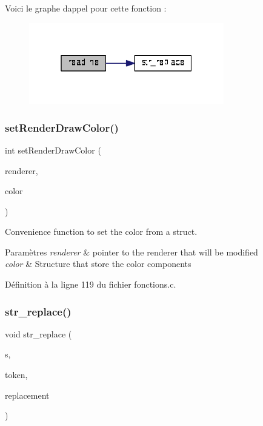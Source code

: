 Voici le graphe d\textquotesingle{}appel pour cette fonction \+:
\nopagebreak
\begin{figure}[H]
\begin{center}
\leavevmode
\includegraphics[width=241pt]{fonctions_8h_afe286242e48f523265fd5fcdae3f7358_cgraph}
\end{center}
\end{figure}
\mbox{\label{fonctions_8h_ad8ec5206bc6a89f1b70d8895523b7919}} 
\subsubsection{set\+Render\+Draw\+Color()}
{\footnotesize\ttfamily int set\+Render\+Draw\+Color (\begin{DoxyParamCaption}\item[{S\+D\+L\+\_\+\+Renderer $\ast$}]{renderer,  }\item[{S\+D\+L\+\_\+\+Color $\ast$}]{color }\end{DoxyParamCaption})}



Convenience function to set the color from a struct. 


\begin{DoxyParams}{Paramètres}
{\em renderer} & pointer to the renderer that will be modified \\
\hline
{\em color} & Structure that store the color components \\
\hline
\end{DoxyParams}


Définition à la ligne 119 du fichier fonctions.\+c.

\mbox{\label{fonctions_8h_afd361e8fd7c973935407a430d0c609a5}} 
\subsubsection{str\+\_\+replace()}
{\footnotesize\ttfamily void str\+\_\+replace (\begin{DoxyParamCaption}\item[{char $\ast$$\ast$}]{s,  }\item[{int}]{token,  }\item[{int}]{replacement }\end{DoxyParamCaption})}



